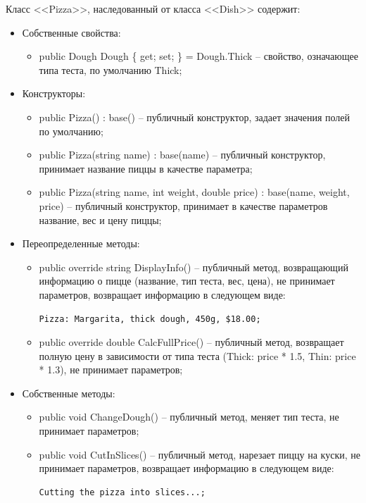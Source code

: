 \documentclass[a4paper,14pt]{extarticle}
\begin{document}
Класс <<Pizza>>, наследованный от класса <<Dish>> содержит:
\begin{itemize}
  \item[--] Собственные свойства:
  \begin{itemize}
    \item[--] public Dough Dough \{ get; set; \} = Dough.Thick -- свойство, означающее типа теста, по умолчанию Thick;
  \end{itemize}
  \item[--] Конструкторы:
  \begin{itemize}
    \item[--] public Pizza() : base() -- публичный конструктор, задает значения полей по умолчанию;
    \item[--] public Pizza(string name) : base(name) -- публичный конструктор, принимает название пиццы в качестве параметра;
    \item[--] public Pizza(string name, int weight, double price) : base(name, weight, price) -- публичный конструктор, принимает в качестве параметров название, вес и цену пиццы;
  \end{itemize}
  \item[--] Переопределенные методы:
  \begin{itemize}
    \item[--] public override string DisplayInfo() -- публичный метод, возвращающий информацию о пицце (название, тип теста, вес, цена), не принимает параметров, возвращает информацию в следующем виде:
      \begin{Verbatim}[tabsize=4]
        Pizza: Margarita, thick dough, 450g, $18.00;
      \end{Verbatim}
    \item[--] public override double CalcFullPrice() -- публичный метод, возвращает полную цену в зависимости от типа теста (Thick: price * 1.5, Thin: price * 1.3), не принимает параметров;
  \end{itemize}
  \item[--] Собственные методы:
  \begin{itemize}
    \item[--] public void ChangeDough() -- публичный метод, меняет тип теста, не принимает параметров;
    \item[--] public void CutInSlices() -- публичный метод, нарезает пиццу на куски, не принимает параметров, возвращает информацию в следующем виде:
    \begin{Verbatim}[tabsize=4]
      Cutting the pizza into slices...;
    \end{Verbatim}
  \end{itemize}
\end{itemize}
\end{document}
